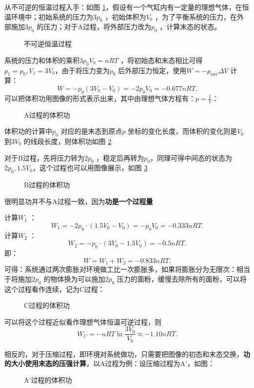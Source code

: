 \begin{eg}
    从不可逆的恒温过程入手：如图 \ref{fig:不可逆恒温过程}，假设有一个气缸内有一定量的理想气体，在恒温环境中；初始系统的压力为$3p_0$ ，初始体积为$V_0$ ，为了平衡系统的压力，在外部施加$3p_0$ 的压力；对于A过程，将外部压力改为$p_0$ ，计算末态的状态。
\begin{figure}[ht!]
    \centering
    \caption{不可逆恒温过程}
    \label{fig:不可逆恒温过程}
\end{figure}

    系统的压力和体积的乘积$3p_0V_0 = nRT $ ，将初始态和末态相比可得$p_1 =p_0, V_1 = 3V_0$，由于将压力变为$p_0$ 后外部压力恒定，使用$W=-p_\text{env}\Delta V$ 计算：\[
        W = -p_0\left( 3V_0-V_0 \right) = -2p_0V_0 = -0.677nRT 
    .\]
    可以把体积功用图像的形式表示出来，其中由理想气体方程有：$p=\frac{1}{V}$：
\begin{figure}[ht!]
    \centering
    \caption{A过程的体积功}
    \label{fig:a过程的体积功}
\end{figure}

体积功的计算中$p_0$ 对应的是末态到原点$p$ 坐标的变化长度，而体积的变化则是$V_0$ 到$3V_0$ 的线段长度，则体积功如图 \ref{fig:a过程的体积功}

对于B过程，先将压力转为$2p_0$ ，稳定后再转为$p_0$，同理可得中间态的状态为$2p_0,1.5V_0$，这个过程也可以用图像展示，如图 \ref{fig:b过程的体积功}
\begin{figure}[ht!]
    \centering
    \caption{B过程的体积功}
    \label{fig:b过程的体积功}
\end{figure}

很明显功并不与A过程一致，因为\textbf{功是一个过程量}

计算$W_1$ ：\[
    W_1 = -2p_0\cdot \left( 1.5V_0-V_0 \right) = -p_0V_0 = -0.333nRT 
.\]
计算$W_2$ ：\[
    W_2 = -p_0\cdot \left( 3V_0-1.5V_0 \right) = -0.5nRT 
.\]
即：\[
    W = W_1 + W_2 = -0.833nRT 
.\]
可得：系统通过两次膨胀对环境做工比一次膨胀多，如果将膨胀分为无限次：相当于将施加$2p_0$ 的物体换为可以施加$2p_0$ 压力的面粉，缓慢去除所有的面粉，可以将这个过程看作连续，记为C过程：
\begin{figure}[ht!]
    \centering
    \caption{C过程的体积功}
    \label{fig:c过程的体积功}
\end{figure}

可以将这个过程近似看作理想气体恒温可逆过程，则 \[
    W_C = -nRT \ln \frac{3V_0}{V_0} \approx -1.10nRT 
.\]
\end{eg}
相反的，对于压缩过程，即环境对系统做功，只需要把图像的初态和末态交换，\textbf{功的大小使用末态的压强计算}，以A过程为例：设压缩过程为A'，如图：
\begin{figure}[ht]
    \centering
    \caption{A'过程的体积功 }
    \label{fig:a'过程的体积功}
\end{figure}

